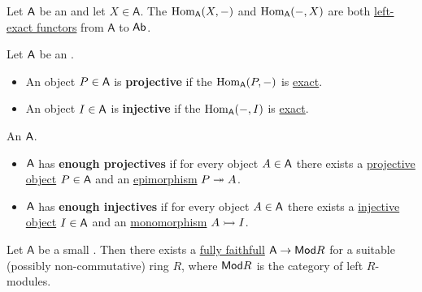 \documentclass[../../main]{subfiles}
\begin{document}
\begin{example}
  Let \(\mathsf{A}\) be an  and let \(X \in \mathsf{A}\).
  The  \(\operatorname{Hom}_{\mathsf{A}}(X, -)\) and \(\operatorname{Hom}_{\mathsf{A}}(-, X)\) are both \hyperref[def:exact-functor]{left-exact functors} from \(\mathsf{A}\) to \(\mathsf{Ab}\).
\end{example}

\begin{definition} \label{def:injective-projective-objects}
  Let \(\mathsf{A}\) be an .
  \begin{itemize}
    \item An object \(P \in \mathsf{A}\) is \textbf{projective} if the  \(\operatorname{Hom}_{\mathsf{A}}(P, -)\) is \hyperref[def:exact-functor]{exact}.
    \item An object \(I \in \mathsf{A}\) is \textbf{injective} if the  \(\operatorname{Hom}_{\mathsf{A}}(-, I)\) is \hyperref[def:exact-functor]{exact}.
  \end{itemize}
\end{definition}

\begin{definition}
  An  \(\mathsf{A}\).
  \begin{itemize}
    \item \(\mathsf{A}\) has \textbf{enough projectives} if for every object \(A \in \mathsf{A}\) there exists a \hyperref[def:injective-projective-objects]{projective object} \(P \in \mathsf{A}\) and an \hyperref[def:mono-epi-morphism]{epimorphism} \(P \twoheadrightarrow A\).
    \item \(\mathsf{A}\) has \textbf{enough injectives} if for every object \(A \in \mathsf{A}\) there exists a \hyperref[def:injective-projective-objects]{injective object} \(I \in \mathsf{A}\) and an \hyperref[def:mono-epi-morphism]{monomorphism} \(A \rightarrowtail I\).
  \end{itemize}
\end{definition}


\begin{theorem} \label{thm:freyd-mitchell}
  Let \(\mathsf{A}\) be a small . Then there exists a \hyperref[def:functor-types]{fully faithfull}  \(\mathsf{A} \to \mathsf{Mod}{R}\) for a suitable (possibly non-commutative) ring \(R\), where \(\mathsf{Mod}{R}\) is the category of left \(R\)-modules.
\end{theorem}
\end{document}
